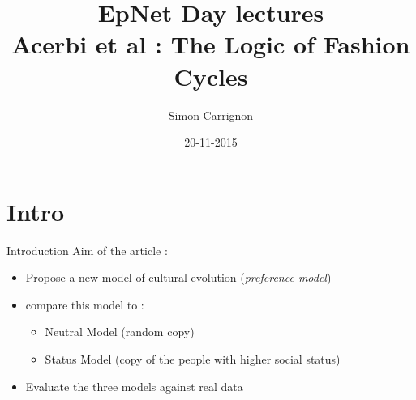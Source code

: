 \documentclass{beamer}
\title{EpNet Day lectures\\
    Acerbi et al : The Logic of Fashion Cycles
}
\author{Simon Carrignon}
\date{20-11-2015}
\begin{document}
\begin{frame}
    
\maketitle
\end{frame}
\section{Intro}
\begin{frame}{Introduction}
    Aim of the article :

    \begin{itemize}
	\item Propose a new model of cultural evolution (\emph{preference model})
	\item compare this model to :
	    \begin{itemize}
		\item Neutral Model (random copy)
		\item Status Model (copy of the people with higher social status)
	    \end{itemize}
	\item Evaluate the three models against real data
    \end{itemize}
\end{frame}
\end{document}
